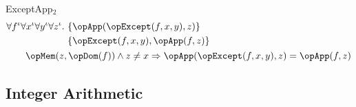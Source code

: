 \documentclass[11pt, a4paper, oneside]{article}
\begin{document}
\begin{axioms}
\item[ExceptApp$_2$] \[
        \begin{aligned}
            &\forall f^\idv \forall x^\idv \forall y^\idv \forall z^\idv.\, \begin{aligned}[t]
                &\st{ \opApp(\opExcept(f, x, y), z) } \\
                &\st{ \opExcept(f, x, y), \opApp(f, z) }
            \end{aligned} \\
            &\qquad \opMem(z, \opDom(f)) \wedge z \neq x \imp \opApp(\opExcept(f, x, y), z) = \opApp(f, z)
        \end{aligned}
    \]

\end{axioms}


    \subsection{Integer Arithmetic}
    \label{subsec:ints}
\end{document}
